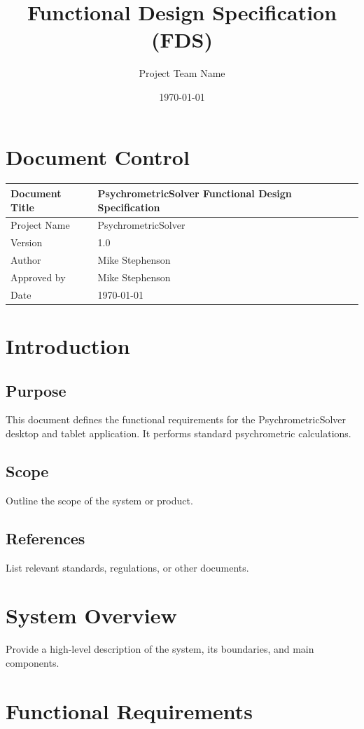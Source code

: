 \documentclass[12pt,a4paper]{article}
\title{Functional Design Specification (FDS)}
\author{Project Team Name}
\date{\today}
\begin{document}
	\maketitle
	\tableofcontents
	\newpage
	
	\section{Document Control}
	\begin{tabular}{|l|l|}
		\hline
		Document Title & PsychrometricSolver Functional Design Specification \\
		\hline
		Project Name & PsychrometricSolver \\
		\hline
		Version & 1.0 \\
		\hline		
		Author & Mike Stephenson \\
		\hline
		Approved by & Mike Stephenson \\
		\hline		
		Date & \today \\
		\hline
	\end{tabular}
	
	\section{Introduction}
	\subsection{Purpose}
	 This document defines the functional requirements for the PsychrometricSolver desktop and tablet application. It performs standard psychrometric calculations.
	
	\subsection{Scope}
	Outline the scope of the system or product. 
	
	\subsection{References}
	List relevant standards, regulations, or other documents. 
	
	\section{System Overview}
	Provide a high-level description of the system, its boundaries, and main components. 
	
	\section{Functional Requirements}
\end{document}
